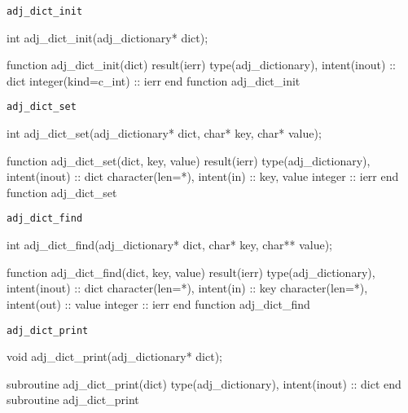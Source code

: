 
\begin{boxwithtitle}{\texttt{adj_dict_init}}
\begin{minipage}{\columnwidth}
\begin{ccode}
  int adj_dict_init(adj_dictionary* dict);
\end{ccode}
\begin{fortrancode}
  function adj_dict_init(dict) result(ierr)
    type(adj_dictionary), intent(inout) :: dict
    integer(kind=c_int) :: ierr
  end function adj_dict_init
\end{fortrancode}
\end{minipage}
\end{boxwithtitle}


\begin{boxwithtitle}{\texttt{adj_dict_set}}
\begin{minipage}{\columnwidth}
\begin{ccode}
  int adj_dict_set(adj_dictionary* dict, char* key, char* value);
\end{ccode}
\begin{fortrancode}
  function adj_dict_set(dict, key, value) result(ierr)
    type(adj_dictionary), intent(inout) :: dict
    character(len=*), intent(in) :: key, value
    integer :: ierr
  end function adj_dict_set
\end{fortrancode}
\end{minipage}
\end{boxwithtitle}


\begin{boxwithtitle}{\texttt{adj_dict_find}}
\begin{minipage}{\columnwidth}
\begin{ccode}
  int adj_dict_find(adj_dictionary* dict, char* key, char** value);
\end{ccode}
\begin{fortrancode}
  function adj_dict_find(dict, key, value) result(ierr)
    type(adj_dictionary), intent(inout) :: dict
    character(len=*), intent(in) :: key
    character(len=*), intent(out) :: value
    integer :: ierr
  end function adj_dict_find
\end{fortrancode}
\end{minipage}
\end{boxwithtitle}


\begin{boxwithtitle}{\texttt{adj_dict_print}}
\begin{minipage}{\columnwidth}
\begin{ccode}
  void adj_dict_print(adj_dictionary* dict);
\end{ccode}
\begin{fortrancode}
  subroutine adj_dict_print(dict)
    type(adj_dictionary), intent(inout) :: dict
  end subroutine adj_dict_print
\end{fortrancode}
\end{minipage}
\end{boxwithtitle}


